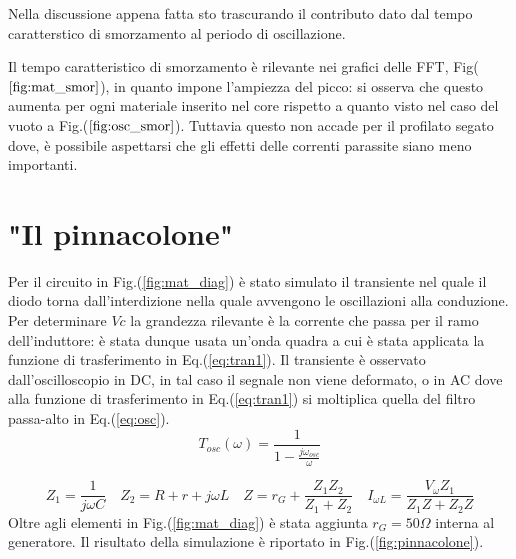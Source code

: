 \documentclass{article}
\begin{document}
        Nella discussione appena fatta sto trascurando il contributo dato dal 
        tempo caratterstico di smorzamento al periodo di oscillazione.
        
        Il tempo caratteristico di smorzamento è rilevante nei grafici 
        delle FFT, Fig($\ref{fig:mat_smor}$), in quanto impone l'ampiezza del picco:
        si osserva che questo aumenta per ogni materiale inserito nel core 
        rispetto a quanto visto nel caso  del vuoto a Fig.($\ref{fig:osc_smor}$).
        Tuttavia questo non accade per il profilato segato dove, è possibile  
        aspettarsi che gli effetti delle correnti parassite siano meno importanti.

        





\section{"Il pinnacolone"}
    Per il circuito in Fig.(\ref{fig:mat_diag}) è stato simulato il transiente nel quale 
    il diodo torna dall'interdizione nella quale avvengono le oscillazioni alla conduzione.
    Per determinare $Vc$ la grandezza rilevante è la corrente che passa per il 
    ramo dell'induttore: è stata dunque usata un'onda quadra a cui è stata applicata la 
    funzione di trasferimento in Eq.(\ref{eq:tran1}).
    Il transiente è osservato dall'oscilloscopio in DC, in tal caso il segnale non viene 
    deformato, o in AC dove alla funzione di trasferimento in Eq.(\ref{eq:tran1}) si 
    moltiplica quella del filtro passa-alto in Eq.(\ref{eq:osc}).
        \begin{equation}
            T_{osc}(\omega)=\frac{1}{1-\frac{j\omega_{osc}}{\omega}}        
            \label{eq:osc}
        \end{equation}
    
        \begin{equation}
            Z_1=\frac{1}{j \omega C} \quad 
            Z_2= R + r + j \omega L \quad 
            Z=r_{G}+\frac{Z_1 Z_2}{Z_1 +Z_2} \quad 
            I_{\omega L}=\frac{V_{\omega} Z_1}{Z_1 Z + Z_2 Z} 
            \label{eq:tran1}
        \end{equation}
    Oltre agli elementi in Fig.(\ref{fig:mat_diag}) è stata aggiunta $r_{G} = 50 \Omega$ interna al generatore.
    Il risultato della simulazione è riportato in Fig.(\ref{fig:pinnacolone}).
\end{document}
